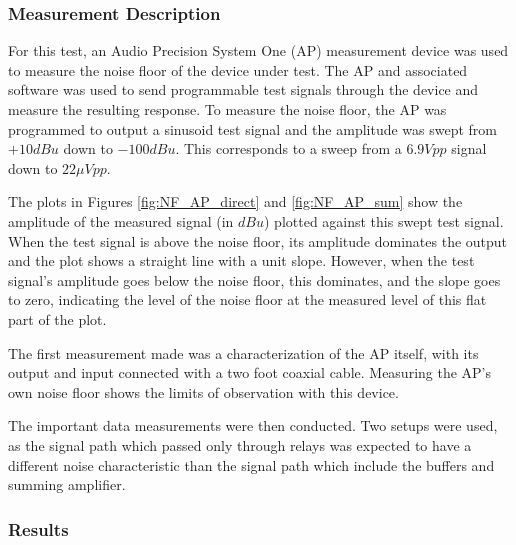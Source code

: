 		\subsubsection{Measurement Description}
		For this test, an Audio Precision System One (AP) measurement device was used to measure the noise floor of the device under test.  The AP and associated software was used to send programmable test signals through the device and measure the resulting response.  To measure the noise floor, the AP was programmed to output a sinusoid test signal and the amplitude was swept from $+10 dBu$ down to $-100 dBu$.  This corresponds to a sweep from a $6.9Vpp$ signal down to $22\mu Vpp$.

		The plots in Figures \ref{fig:NF_AP_direct} and \ref{fig:NF_AP_sum} show the amplitude of the measured signal (in $dBu$) plotted against this swept test signal.  When the test signal is above the noise floor, its amplitude dominates the output and the plot shows a straight line with a unit slope.  However, when the test signal's amplitude goes below the noise floor, this dominates, and the slope goes to zero, indicating the level of the noise floor at the measured level of this flat part of the plot.

		The first measurement made was a characterization of the AP itself, with its output and input connected with a two foot coaxial cable.  Measuring the AP's own noise floor shows the limits of observation with this device.

		The important data measurements were then conducted.  Two setups were used, as the signal path which passed only through relays was expected to have a different noise characteristic than the signal path which include the buffers and summing amplifier.

		\subsubsection{Results}

